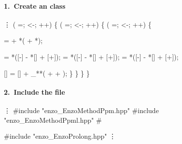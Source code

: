 
\begin{frame}[fragile] 
\secframetitle{\ssDevelMethod}
\framesubtitle{1.~Create an  class}
\begin{semiverbatim}\scriptsize
        \vdots
    ( =; <-; ++) \{
       ( =; <-; ++) \{
          ( =; <-; ++) \{

              =  + *( + *);

              = *([-] - *[] + [+]);
              = *([-] - *[] + [+]);
              = *([-] - *[] + [+]);

            [] = [] + _**( +  + );
         \}
      \}
   \}
\}
\end{semiverbatim}
\end{frame}


\begin{frame}[fragile] 
\secframetitle{\ssDevelMethod}
\framesubtitle{2.~Include the  file}
%
\begin{semiverbatim}
       \vdots
   #include "enzo_EnzoMethodPpm.hpp"
   #include "enzo_EnzoMethodPpml.hpp"
   # 

   #include "enzo_EnzoProlong.hpp"
       \vdots
\end{semiverbatim}


\end{frame}

